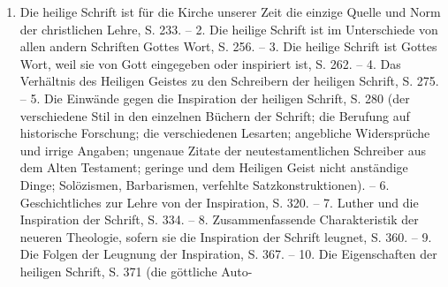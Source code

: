 \begin{enumerate}
    \item Die heilige Schrift ist für die Kirche unserer Zeit die einzige Quelle und Norm der christlichen Lehre, S. 233. -- 2. Die heilige Schrift ist im Unterschiede von allen andern Schriften Gottes Wort, S. 256. -- 3. Die heilige Schrift ist Gottes Wort, weil sie von Gott eingegeben oder inspiriert ist, S. 262. -- 4. Das Verhältnis des Heiligen Geistes zu den Schreibern der heiligen Schrift, S. 275. -- 5. Die Einwände gegen die Inspiration der heiligen Schrift, S. 280 (der verschiedene Stil in den einzelnen Büchern der Schrift; die Berufung auf historische Forschung; die verschiedenen Lesarten; angebliche Widersprüche und irrige Angaben; ungenaue Zitate der neutestamentlichen Schreiber aus dem Alten Testament; geringe und dem Heiligen Geist nicht anständige Dinge; Solözismen, Barbarismen, verfehlte Satzkonstruktionen). -- 6. Geschichtliches zur Lehre von der Inspiration, S. 320. -- 7. Luther und die Inspiration der Schrift, S. 334. -- 8. Zusammenfassende Charakteristik der neueren Theologie, sofern sie die Inspiration der Schrift leugnet, S. 360. -- 9. Die Folgen der Leugnung der Inspiration, S. 367. -- 10. Die Eigenschaften der heiligen Schrift, S. 371 (die göttliche Auto-
\end{enumerate}